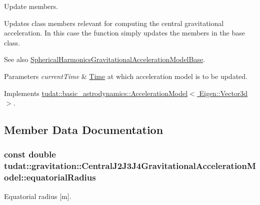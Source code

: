 Update members. 

Updates class members relevant for computing the central gravitational acceleration. In this case the function simply updates the members in the base class. \begin{DoxySeeAlso}{See also}
\hyperlink{classtudat_1_1gravitation_1_1SphericalHarmonicsGravitationalAccelerationModelBase}{Spherical\+Harmonics\+Gravitational\+Acceleration\+Model\+Base}. 
\end{DoxySeeAlso}

\begin{DoxyParams}{Parameters}
{\em current\+Time} & \hyperlink{classtudat_1_1Time}{Time} at which acceleration model is to be updated. \\
\hline
\end{DoxyParams}


Implements \hyperlink{classtudat_1_1basic__astrodynamics_1_1AccelerationModel_a966e85b72300b8cbc99ba60e40108d71}{tudat\+::basic\+\_\+astrodynamics\+::\+Acceleration\+Model$<$ Eigen\+::\+Vector3d $>$}.



\subsection{Member Data Documentation}
\subsubsection[{\texorpdfstring{equatorial\+Radius}{equatorialRadius}}]{\setlength{\rightskip}{0pt plus 5cm}const double tudat\+::gravitation\+::\+Central\+J2\+J3\+J4\+Gravitational\+Acceleration\+Model\+::equatorial\+Radius\hspace{0.3cm}{\ttfamily [protected]}}\hypertarget{classtudat_1_1gravitation_1_1CentralJ2J3J4GravitationalAccelerationModel_a651dd6a21d94ff0adf69f46467eb2b9c}{}\label{classtudat_1_1gravitation_1_1CentralJ2J3J4GravitationalAccelerationModel_a651dd6a21d94ff0adf69f46467eb2b9c}


Equatorial radius \mbox{[}m\mbox{]}. 

